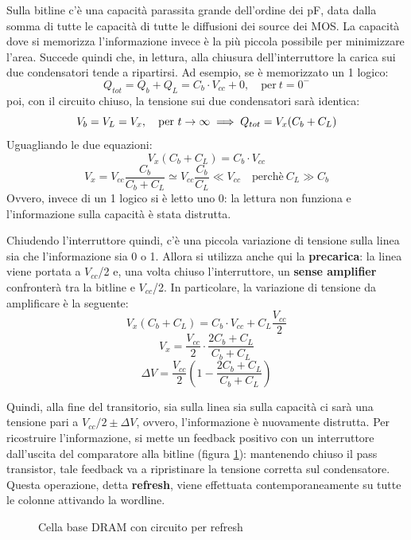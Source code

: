 \documentclass[11pt,4paper]{report}
\newcommand{\vcc}{$V_{cc}$}
\begin{document}
Sulla bitline c'è una capacità parassita grande dell'ordine dei \si{\pico\farad}, data dalla somma di tutte le capacità di tutte le diffusioni dei source dei MOS. La capacità dove si memorizza l'informazione invece è la più piccola possibile per minimizzare l'area. Succede quindi che, in lettura, alla chiusura dell'interruttore la carica sui due condensatori tende a ripartirsi. Ad esempio, se è memorizzato un 1 logico:
\begin{equation*}
	Q_{tot} = Q_b + Q_L = C_b \cdot V_{cc} + 0, \quad \text{per} \ t=0^-
\end{equation*}
poi, con il circuito chiuso, la tensione sui due condensatori sarà identica:
\begin{equation*}
	V_b = V_L = V_x, \quad \text{per} \ t \to \infty \\
\implies Q_{tot} = V_x(C_b+C_L)
\end{equation*}
Uguagliando le due equazioni:
\begin{equation*}
	V_x(C_b+C_L) = C_b \cdot V_{cc}
\end{equation*}
\begin{equation*}
	V_x = V_{cc}\frac{C_b}{C_b + C_L} \simeq V_{cc}\frac{C_b}{C_L} \ll V_{cc} \quad \text{perchè} \ C_L \gg C_b
\end{equation*}
Ovvero, invece di un 1 logico si è letto uno 0: la lettura non funziona e l'informazione sulla capacità è stata distrutta.

Chiudendo l'interruttore quindi, c'è una piccola variazione di tensione sulla linea sia che l'informazione sia 0 o 1. Allora si utilizza anche qui la \textbf{precarica}: la linea viene portata a \vcc/2 e, una volta chiuso l'interruttore, un \textbf{sense amplifier} confronterà tra la bitline e \vcc/2. In particolare, la variazione di tensione da amplificare è la seguente:
\begin{equation*}
	V_x(C_b+C_L) = C_b \cdot V_{cc} + C_L\frac{V_{cc}}{2}
\end{equation*}
\begin{equation*}
	V_x = \frac{V_{cc}}{2} \cdot \frac{2C_b+C_L}{C_b+C_L}
\end{equation*}
\begin{equation*}
	\Delta V = \frac{V_{cc}}{2} \left(1-\frac{2C_b+C_L}{C_b+C_L} \right)
\end{equation*}

Quindi, alla fine del transitorio, sia sulla linea sia sulla capacità ci sarà una tensione pari a $V_{cc}/2 \pm \Delta V$, ovvero, l'informazione è nuovamente distrutta. Per ricostruire l'informazione, si mette un feedback positivo con un interruttore dall'uscita del comparatore alla bitline (figura \ref{fig:dram_sense}): mantenendo chiuso il pass transistor, tale feedback va a ripristinare la tensione corretta sul condensatore. Questa operazione, detta \textbf{refresh}, viene effettuata contemporaneamente su tutte le colonne attivando la wordline.
\begin{figure}[hbtp]
	\centering
	
	\caption{Cella base DRAM con circuito per refresh}
	\label{fig:dram_sense}
\end{figure}
\end{document}
